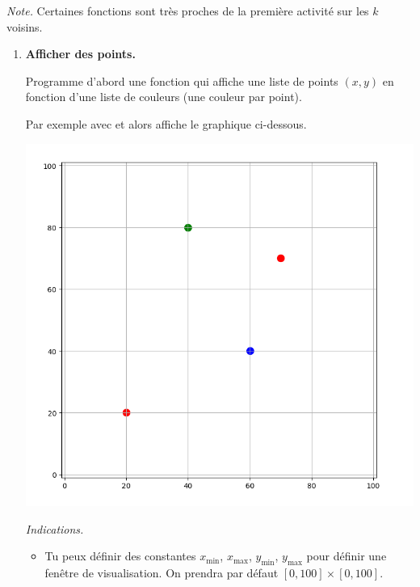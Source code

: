 \documentclass[10pt,class=report,crop=false]{standalone}
\begin{document}

\begin{activite}[Barycentres]
	

\emph{Note.} Certaines fonctions sont très proches de la première activité sur les $k$ voisins.

\begin{enumerate}
	\item \textbf{Afficher des points.}
	
	Programme d'abord une fonction 
	qui affiche une liste de points $(x,y)$ en fonction d'une liste de couleurs (une couleur par point).
	
	Par exemple avec  et 
	alors  affiche le graphique ci-dessous.
	
	\begin{center}
	\includegraphics[scale=\myscale,scale=0.17]{ecran-barycentres-1} 
	\end{center}
	
	\emph{Indications.} 
	\begin{itemize}
		\item Tu peux définir des constantes $x_{\min}$, $x_{\max}$, $y_{\min}$, $y_{\max}$
		pour définir une fenêtre de visualisation. On prendra par défaut $[0,100]\times[0,100]$.
		

\end{itemize}
\end{enumerate}
\end{activite}
\end{document}

